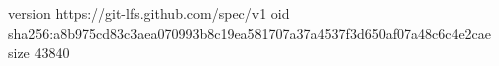 version https://git-lfs.github.com/spec/v1
oid sha256:a8b975cd83c3aea070993b8c19ea581707a37a4537f3d650af07a48c6c4e2cae
size 43840
